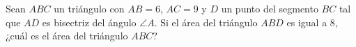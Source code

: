 Sean $ABC$ un triángulo con $AB = 6$, $AC = 9$ y $D$ un punto del segmento $BC$ tal que $AD$ es bisectriz del ángulo $\angle A$. Si el área del triángulo $ABD$ es igual a $8$, ¿cuál es el área del triángulo $ABC$?